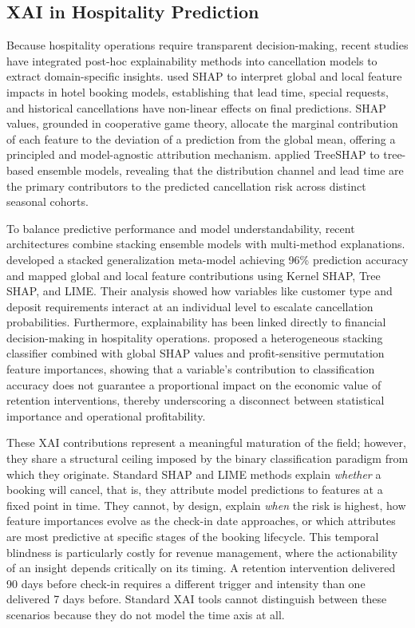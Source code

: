 \documentclass[pdflatex,iicol,sn-mathphys-ay]{sn-jnl}
\theoremstyle{thmstyleone}%
\theoremstyle{thmstyletwo}%
\theoremstyle{thmstylethree}%
\begin{document}
\subsection{XAI in Hospitality Prediction}

Because hospitality operations require transparent decision-making, recent studies have integrated post-hoc explainability methods into cancellation models to extract domain-specific insights. \cite{gomez2025machine} used SHAP to interpret global and local feature impacts in hotel booking models, establishing that lead time, special requests, and historical cancellations have non-linear effects on final predictions. SHAP values, grounded in cooperative game theory, allocate the marginal contribution of each feature to the deviation of a prediction from the global mean, offering a principled and model-agnostic attribution mechanism. \cite{herrera2024machine} applied TreeSHAP to tree-based ensemble models, revealing that the distribution channel and lead time are the primary contributors to the predicted cancellation risk across distinct seasonal cohorts.

To balance predictive performance and model understandability, recent architectures combine stacking ensemble models with multi-method explanations. \cite{talal2025hotel} developed a stacked generalization meta-model achieving 96\% prediction accuracy and mapped global and local feature contributions using Kernel SHAP, Tree SHAP, and LIME. Their analysis showed how variables like customer type and deposit requirements interact at an individual level to escalate cancellation probabilities. Furthermore, explainability has been linked directly to financial decision-making in hospitality operations. \cite{liu2025explainable} proposed a heterogeneous stacking classifier combined with global SHAP values and profit-sensitive permutation feature importances, showing that a variable's contribution to classification accuracy does not guarantee a proportional impact on the economic value of retention interventions, thereby underscoring a disconnect between statistical importance and operational profitability.

These XAI contributions represent a meaningful maturation of the field; however, they share a structural ceiling imposed by the binary classification paradigm from which they originate. Standard SHAP and LIME methods explain \textit{whether} a booking will cancel, that is, they attribute model predictions to features at a fixed point in time. They cannot, by design, explain \textit{when} the risk is highest, how feature importances evolve as the check-in date approaches, or which attributes are most predictive at specific stages of the booking lifecycle. This temporal blindness is particularly costly for revenue management, where the actionability of an insight depends critically on its timing. A retention intervention delivered 90 days before check-in requires a different trigger and intensity than one delivered 7 days before. Standard XAI tools cannot distinguish between these scenarios because they do not model the time axis at all.
\end{document}
